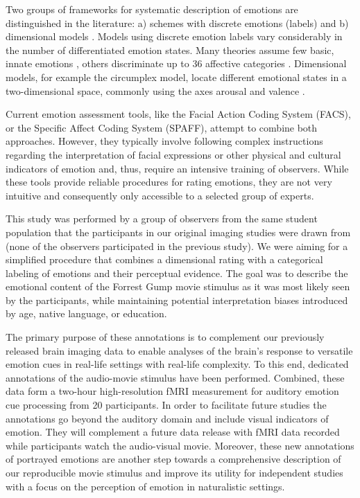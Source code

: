 Two groups of frameworks for systematic description of emotions are
distinguished in the literature: a) schemes with discrete emotions (labels) and
b) dimensional models \cite{GW2007}.  Models using discrete emotion labels vary
considerably in the number of differentiated emotion states. Many theories
assume few basic, innate emotions \cite{Ekm1992a}, others discriminate up to
36 affective categories \cite{Sch2005}.  Dimensional models, for example the
circumplex model, locate different emotional states in a two-dimensional
space, commonly using the axes arousal and valence \cite{Rus1980}.

Current emotion assessment tools, like the Facial Action Coding System (FACS),
or the Specific Affect Coding System (SPAFF)\cite{CG2007}, attempt to combine
both approaches. However, they typically involve following complex instructions
regarding the interpretation of facial expressions or other physical and
cultural indicators of emotion\cite[p. 281]{CG2007} and, thus, require an
intensive training of observers. While these tools provide reliable procedures
for rating emotions, they are not very intuitive and consequently only
accessible to a selected group of experts. 

This study was performed by a group of observers from the same student population
that the participants in our original imaging studies were drawn
from\cite{HBI+14} (none of the observers participated in the previous study). We were aiming for a simplified procedure that combines a dimensional rating with a categorical labeling of emotions and their perceptual evidence.
The goal was to describe the emotional content of the Forrest Gump movie
stimulus as it was most likely seen by the participants, while maintaining
potential interpretation biases introduced by age, native language, or
education.

The primary purpose of these annotations is to complement our previously
released brain imaging data to enable analyses of the brain's response to
versatile emotion cues in real-life settings with real-life complexity. To this
end, dedicated annotations of the audio-movie stimulus have been performed.
Combined, these data form a two-hour high-resolution fMRI measurement for
auditory emotion cue processing from 20 participants. In order to facilitate
future studies the annotations go beyond the auditory domain and include
visual indicators of emotion. They will complement a future data release with
fMRI data recorded while participants watch the audio-visual movie.  Moreover,
these new annotations of portrayed emotions are another step towards a
comprehensive description of our reproducible movie stimulus\cite{HBI+14} and
improve its utility for independent studies with a focus on the perception of
emotion in naturalistic settings.


